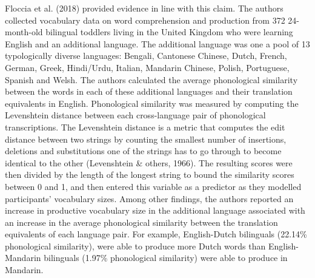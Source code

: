 \documentclass[
  english,
  man,man,floatsintext]{apa6}
\begin{document}
Floccia et al. (2018) provided evidence in line with this claim. The authors collected vocabulary data on word comprehension and production from 372 24-month-old bilingual toddlers living in the United Kingdom who were learning English and an additional language. The additional language was one a pool of 13 typologically diverse languages: Bengali, Cantonese Chinese, Dutch, French, German, Greek, Hindi/Urdu, Italian, Mandarin Chinese, Polish, Portuguese, Spanish and Welsh. The authors calculated the average phonological similarity between the words in each of these additional languages and their translation equivalents in English. Phonological similarity was measured by computing the Levenshtein distance between each cross-language pair of phonological transcriptions. The Levenshtein distance is a metric that computes the edit distance between two strings by counting the smallest number of insertions, deletions and substitutions one of the strings has to go through to become identical to the other (Levenshtein \& others, 1966). The resulting scores were then divided by the length of the longest string to bound the similarity scores between 0 and 1, and then entered this variable as a predictor as they modelled participants' vocabulary sizes. Among other findings, the authors reported an increase in productive vocabulary size in the additional language associated with an increase in the average phonological similarity between the translation equivalents of each language pair. For example, English-Dutch bilinguals (22.14\% phonological similarity), were able to produce more Dutch words than English-Mandarin bilinguals (1.97\% phonological similarity) were able to produce in Mandarin.
\end{document}
